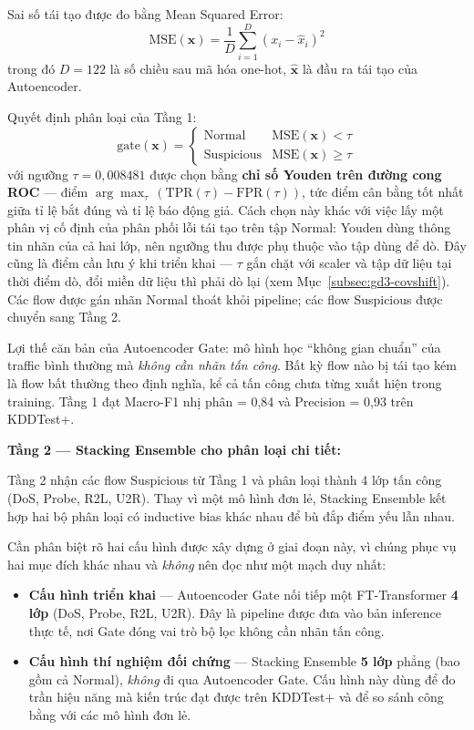 \documentclass[../DoAn.tex]{subfiles}
\begin{document}
Sai số tái tạo được đo bằng Mean Squared Error:
\begin{equation}
    \text{MSE}(\mathbf{x}) = \frac{1}{D}\sum_{i=1}^{D}(x_i - \hat{x}_i)^2
    \label{eq:ae-mse}
\end{equation}
trong đó $D = 122$ là số chiều sau mã hóa one-hot, $\hat{\mathbf{x}}$ là đầu ra tái tạo của Autoencoder.

Quyết định phân loại của Tầng 1:
\begin{equation}
    \text{gate}(\mathbf{x}) = \begin{cases}
        \text{Normal} & \text{MSE}(\mathbf{x}) < \tau \\
        \text{Suspicious} & \text{MSE}(\mathbf{x}) \geq \tau
    \end{cases}
    \label{eq:ae-gate}
\end{equation}
với ngưỡng $\tau = 0{,}008481$ được chọn bằng \textbf{chỉ số Youden trên đường cong ROC} --- điểm $\arg\max_\tau\,(\text{TPR}(\tau) - \text{FPR}(\tau))$, tức điểm cân bằng tốt nhất giữa tỉ lệ bắt đúng và tỉ lệ báo động giả. Cách chọn này khác với việc lấy một phân vị cố định của phân phối lỗi tái tạo trên tập Normal: Youden dùng thông tin nhãn của cả hai lớp, nên ngưỡng thu được phụ thuộc vào tập dùng để dò. Đây cũng là điểm cần lưu ý khi triển khai --- $\tau$ gắn chặt với scaler và tập dữ liệu tại thời điểm dò, đổi miền dữ liệu thì phải dò lại (xem Mục~\ref{subsec:gd3-covshift}). Các flow được gán nhãn Normal thoát khỏi pipeline; các flow Suspicious được chuyển sang Tầng 2.

Lợi thế căn bản của Autoencoder Gate: mô hình học ``không gian chuẩn'' của traffic bình thường mà \textit{không cần nhãn tấn công}. Bất kỳ flow nào bị tái tạo kém là flow bất thường theo định nghĩa, kể cả tấn công chưa từng xuất hiện trong training. Tầng 1 đạt Macro-F1 nhị phân = 0,84 và Precision = 0,93 trên KDDTest+.

\textbf{Tầng 2 --- Stacking Ensemble cho phân loại chi tiết:}

Tầng 2 nhận các flow Suspicious từ Tầng 1 và phân loại thành 4 lớp tấn công (DoS, Probe, R2L, U2R). Thay vì một mô hình đơn lẻ, Stacking Ensemble kết hợp hai bộ phân loại có inductive bias khác nhau để bù đắp điểm yếu lẫn nhau.

Cần phân biệt rõ hai cấu hình được xây dựng ở giai đoạn này, vì chúng phục vụ hai mục đích khác nhau và \textit{không} nên đọc như một mạch duy nhất:

\begin{itemize}
    \item \textbf{Cấu hình triển khai} --- Autoencoder Gate nối tiếp một FT-Transformer \textbf{4 lớp} (DoS, Probe, R2L, U2R). Đây là pipeline được đưa vào bản inference thực tế, nơi Gate đóng vai trò bộ lọc không cần nhãn tấn công.
    \item \textbf{Cấu hình thí nghiệm đối chứng} --- Stacking Ensemble \textbf{5 lớp} phẳng (bao gồm cả Normal), \textit{không} đi qua Autoencoder Gate. Cấu hình này dùng để đo trần hiệu năng mà kiến trúc đạt được trên KDDTest+ và để so sánh công bằng với các mô hình đơn lẻ.
\end{itemize}
\end{document}
